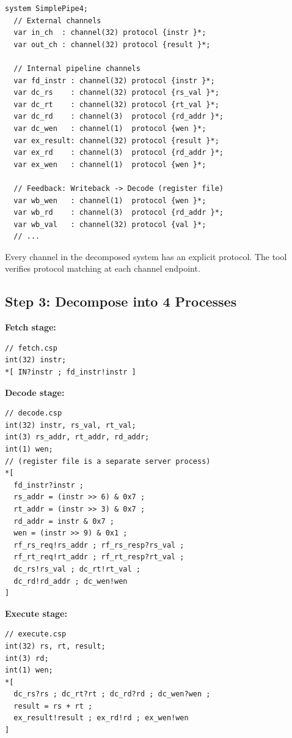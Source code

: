 \documentclass[11pt]{article}
\begin{document}
\begin{Verbatim}[samepage=true]
system SimplePipe4;
  // External channels
  var in_ch  : channel(32) protocol {instr }*;
  var out_ch : channel(32) protocol {result }*;

  // Internal pipeline channels
  var fd_instr : channel(32) protocol {instr }*;
  var dc_rs    : channel(32) protocol {rs_val }*;
  var dc_rt    : channel(32) protocol {rt_val }*;
  var dc_rd    : channel(3)  protocol {rd_addr }*;
  var dc_wen   : channel(1)  protocol {wen }*;
  var ex_result: channel(32) protocol {result }*;
  var ex_rd    : channel(3)  protocol {rd_addr }*;
  var ex_wen   : channel(1)  protocol {wen }*;

  // Feedback: Writeback -> Decode (register file)
  var wb_wen   : channel(1)  protocol {wen }*;
  var wb_rd    : channel(3)  protocol {rd_addr }*;
  var wb_val   : channel(32) protocol {val }*;
  // ...
\end{Verbatim}

Every channel in the decomposed system has an explicit protocol.
The tool verifies protocol matching at each channel endpoint.

\subsection{Step 3: Decompose into 4 Processes}

\textbf{Fetch stage:}

\begin{Verbatim}[samepage=true]
// fetch.csp
int(32) instr;
*[ IN?instr ; fd_instr!instr ]
\end{Verbatim}

\textbf{Decode stage:}

\begin{Verbatim}[samepage=true]
// decode.csp
int(32) instr, rs_val, rt_val;
int(3) rs_addr, rt_addr, rd_addr;
int(1) wen;
// (register file is a separate server process)
*[
  fd_instr?instr ;
  rs_addr = (instr >> 6) & 0x7 ;
  rt_addr = (instr >> 3) & 0x7 ;
  rd_addr = instr & 0x7 ;
  wen = (instr >> 9) & 0x1 ;
  rf_rs_req!rs_addr ; rf_rs_resp?rs_val ;
  rf_rt_req!rt_addr ; rf_rt_resp?rt_val ;
  dc_rs!rs_val ; dc_rt!rt_val ;
  dc_rd!rd_addr ; dc_wen!wen
]
\end{Verbatim}

\textbf{Execute stage:}

\begin{Verbatim}[samepage=true]
// execute.csp
int(32) rs, rt, result;
int(3) rd;
int(1) wen;
*[
  dc_rs?rs ; dc_rt?rt ; dc_rd?rd ; dc_wen?wen ;
  result = rs + rt ;
  ex_result!result ; ex_rd!rd ; ex_wen!wen
]
\end{Verbatim}
\end{document}
